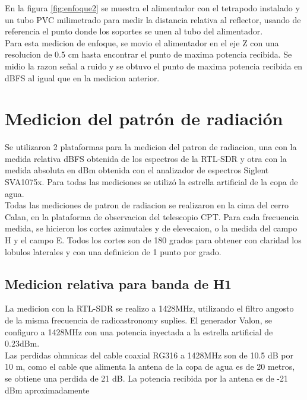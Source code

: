 En la figura \ref{fig:enfoque2} se muestra el alimentador con el tetrapodo instalado y un tubo PVC milimetrado para medir la distancia relativa al reflector, usando de referencia el punto donde los soportes se unen al tubo del alimentador.\\

Para esta medicion de enfoque, se movio el alimentador en el eje Z con una resolucion de 0.5 cm hasta encontrar el punto de maxima potencia recibida. Se midio la razon señal a ruido y se obtuvo el punto de maxima potencia recibida en dBFS al igual que en la medicion anterior.\\

\section{Medicion del patrón de radiación}

Se utilizaron 2 plataformas para la medicion del patron de radiacion, una con la medida relativa dBFS obtenida de los espectros de la RTL-SDR y otra con la medida absoluta en dBm obtenida con el analizador de espectros Siglent SVA1075x. Para todas las mediciones se utilizó la estrella artificial de la copa de agua.\\

Todas las mediciones de patron de radiacion se realizaron en la cima del cerro Calan, en la plataforma de observacion del telescopio CPT. Para cada frecuencia medida, se hicieron los cortes azimutales y de elevecaion, o la medida del campo H y el campo E. Todos los cortes son de 180 grados para obtener con claridad los lobulos laterales y con una definicion de 1 punto por grado.\\


\subsection{Medicion relativa para banda de H1}

La medicion con la RTL-SDR se realizo a 1428MHz, utilizando el filtro angosto de la misma frecuencia de radioastronomy suplies. El generador Valon, se configuro a 1428MHz con una potencia inyectada a la estrella artificial de 0.23dBm.\\

Las perdidas ohmnicas del cable coaxial RG316 a 1428MHz son de 10.5 dB por 10 m, como el cable que alimenta la antena de la copa de agua es de 20 metros, se obtiene una perdida de 21 dB. La potencia recibida por la antena es de -21 dBm aproximadamente\\

